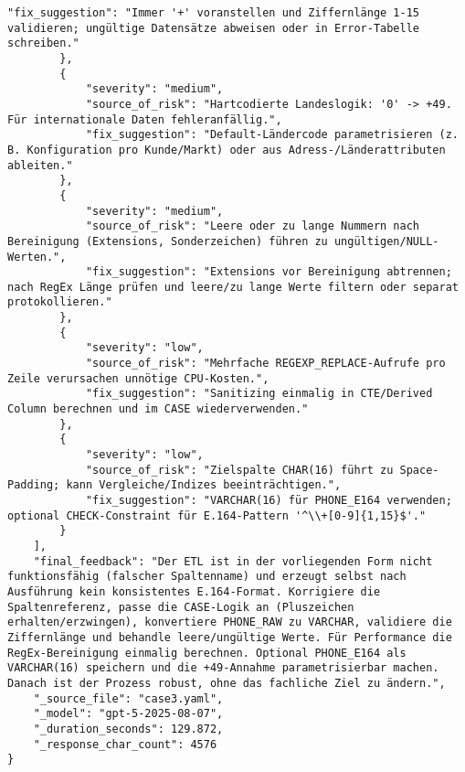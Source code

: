 \begin{lstlisting}[caption={Ausgabe: GPT-5 Anwendungsfall 3 Konsistenzdurchlauf},label={gpt_case3_prompt2}]
            "fix_suggestion": "Immer '+' voranstellen und Ziffernlänge 1-15 validieren; ungültige Datensätze abweisen oder in Error-Tabelle schreiben."
        },
        {
            "severity": "medium",
            "source_of_risk": "Hartcodierte Landeslogik: '0' -> +49. Für internationale Daten fehleranfällig.",
            "fix_suggestion": "Default-Ländercode parametrisieren (z. B. Konfiguration pro Kunde/Markt) oder aus Adress-/Länderattributen ableiten."
        },
        {
            "severity": "medium",
            "source_of_risk": "Leere oder zu lange Nummern nach Bereinigung (Extensions, Sonderzeichen) führen zu ungültigen/NULL-Werten.",
            "fix_suggestion": "Extensions vor Bereinigung abtrennen; nach RegEx Länge prüfen und leere/zu lange Werte filtern oder separat protokollieren."
        },
        {
            "severity": "low",
            "source_of_risk": "Mehrfache REGEXP_REPLACE-Aufrufe pro Zeile verursachen unnötige CPU-Kosten.",
            "fix_suggestion": "Sanitizing einmalig in CTE/Derived Column berechnen und im CASE wiederverwenden."
        },
        {
            "severity": "low",
            "source_of_risk": "Zielspalte CHAR(16) führt zu Space-Padding; kann Vergleiche/Indizes beeinträchtigen.",
            "fix_suggestion": "VARCHAR(16) für PHONE_E164 verwenden; optional CHECK-Constraint für E.164-Pattern '^\\+[0-9]{1,15}$'."
        }
    ],
    "final_feedback": "Der ETL ist in der vorliegenden Form nicht funktionsfähig (falscher Spaltenname) und erzeugt selbst nach Ausführung kein konsistentes E.164-Format. Korrigiere die Spaltenreferenz, passe die CASE-Logik an (Pluszeichen erhalten/erzwingen), konvertiere PHONE_RAW zu VARCHAR, validiere die Ziffernlänge und behandle leere/ungültige Werte. Für Performance die RegEx-Bereinigung einmalig berechnen. Optional PHONE_E164 als VARCHAR(16) speichern und die +49-Annahme parametrisierbar machen. Danach ist der Prozess robust, ohne das fachliche Ziel zu ändern.",
    "_source_file": "case3.yaml",
    "_model": "gpt-5-2025-08-07",
    "_duration_seconds": 129.872,
    "_response_char_count": 4576
}
\end{lstlisting}

